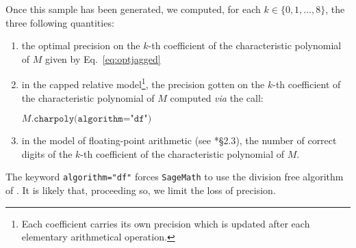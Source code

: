 \documentclass{sig-alternate-05-2015}
\begin{document}
Once this sample has been generated, we computed, for each $k \in \{0, 
1, \ldots, 8\}$, the three following quantities:

\vspace{-2mm}

\begin{enumerate}[$\bullet$]
\renewcommand{\itemsep}{0pt}
\item the optimal precision on the $k$-th coefficient of the 
characteristic polynomial of $M$ given by Eq.~\eqref{eq:optjagged}
\item in the capped relative model\footnote{Each 
coefficient carries its own precision which is updated after each 
elementary arithmetical operation.},
the precision gotten on the $k$-th coefficient of the 
characteristic polynomial of $M$ computed \emph{via} the call:

\hfill$M\texttt{.charpoly(algorithm="df")}$\hfill\null

\item in the model of floating-point arithmetic (see 
\cite{caruso-coursepadic}*{\S 2.3}), the number of correct digits of the 
$k$-th coefficient of the characteristic polynomial of $M$.
\end{enumerate}

\begin{rem}
The keyword \texttt{algorithm="df"} forces \texttt{SageMath} to use the 
division free algorithm of \cite{}. It is likely that, proceeding so, we 
limit the loss of precision.
\end{rem}
\end{document}
